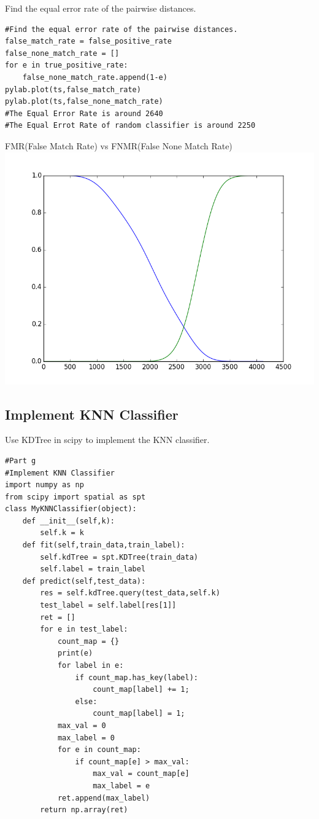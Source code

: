 \documentclass[a4paper]{article}
\begin{document}
Find the equal error rate of the pairwise distances.
\begin{lstlisting}
#Find the equal error rate of the pairwise distances.
false_match_rate = false_positive_rate
false_none_match_rate = []
for e in true_positive_rate:
    false_none_match_rate.append(1-e)
pylab.plot(ts,false_match_rate)
pylab.plot(ts,false_none_match_rate)
#The Equal Error Rate is around 2640
#The Equal Errot Rate of random classifier is around 2250
\end{lstlisting}
\begin{center}
FMR(False Match Rate) vs FNMR(False None Match Rate)
\includegraphics[scale=0.63]{Equal_Error_Rate.png}
\end{center}

\subsection*{Implement KNN Classifier}
Use KDTree in scipy to implement the KNN classifier.
\begin{lstlisting}
#Part g
#Implement KNN Classifier
import numpy as np
from scipy import spatial as spt
class MyKNNClassifier(object):
    def __init__(self,k):
        self.k = k        
    def fit(self,train_data,train_label):
        self.kdTree = spt.KDTree(train_data)
        self.label = train_label        
    def predict(self,test_data):
        res = self.kdTree.query(test_data,self.k)
        test_label = self.label[res[1]]
        ret = []
        for e in test_label:           
            count_map = {}
            print(e)
            for label in e:
                if count_map.has_key(label):
                    count_map[label] += 1;
                else:
                    count_map[label] = 1;            
            max_val = 0
            max_label = 0
            for e in count_map:
                if count_map[e] > max_val:
                    max_val = count_map[e]
                    max_label = e
            ret.append(max_label)      
        return np.array(ret)
\end{lstlisting}
\end{document}
